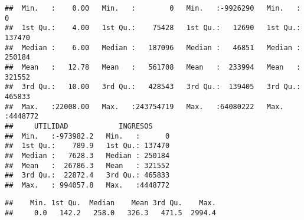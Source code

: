 \documentclass[
]{article}
\newenvironment{Shaded}{\begin{snugshade}}{\end{snugshade}}
\newcommand{\CommentTok}[1]{\textcolor[rgb]{0.56,0.35,0.01}{\textit{#1}}}
\newcommand{\DecValTok}[1]{\textcolor[rgb]{0.00,0.00,0.81}{#1}}
\newcommand{\FunctionTok}[1]{\textcolor[rgb]{0.13,0.29,0.53}{\textbf{#1}}}
\newcommand{\NormalTok}[1]{#1}
\newcommand{\OtherTok}[1]{\textcolor[rgb]{0.56,0.35,0.01}{#1}}
\newcommand{\SpecialCharTok}[1]{\textcolor[rgb]{0.81,0.36,0.00}{\textbf{#1}}}
\newcommand{\StringTok}[1]{\textcolor[rgb]{0.31,0.60,0.02}{#1}}
\begin{document}
\begin{verbatim}
##  Min.   :    0.00   Min.   :        0   Min.   :-9926290   Min.   :      0   
##  1st Qu.:    4.00   1st Qu.:    75428   1st Qu.:   12690   1st Qu.: 137470   
##  Median :    6.00   Median :   187096   Median :   46851   Median : 250184   
##  Mean   :   12.78   Mean   :   561708   Mean   :  233994   Mean   : 321552   
##  3rd Qu.:   10.00   3rd Qu.:   428543   3rd Qu.:  139405   3rd Qu.: 465833   
##  Max.   :22008.00   Max.   :243754719   Max.   :64080222   Max.   :4448772   
##     UTILIDAD            INGRESOS      
##  Min.   :-973982.2   Min.   :      0  
##  1st Qu.:    789.9   1st Qu.: 137470  
##  Median :   7628.3   Median : 250184  
##  Mean   :  26786.3   Mean   : 321552  
##  3rd Qu.:  22872.4   3rd Qu.: 465833  
##  Max.   : 994057.8   Max.   :4448772
\end{verbatim}

\begin{Shaded}
\end{Shaded}

\begin{verbatim}
##    Min. 1st Qu.  Median    Mean 3rd Qu.    Max. 
##     0.0   142.2   258.0   326.3   471.5  2994.4
\end{verbatim}
\end{document}
